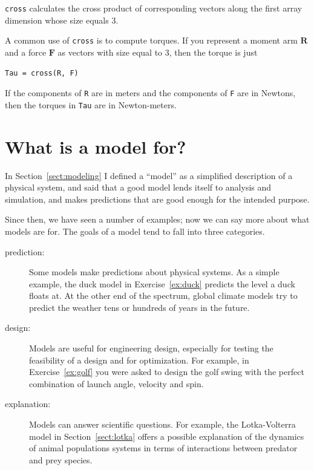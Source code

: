 \documentclass[
]{book}
\renewcommand{\vec}[1]{\bm{\mathbf{#1}}}
\begin{document}
{\tt cross} calculates the cross product of corresponding vectors along
the first array dimension whose size equals 3.

A common use of {\tt cross} is to compute torques.  If you represent
a moment arm $\vec{R}$ and a force $\vec{F}$ as vectors with size equal
to 3, then the torque is just

\begin{verbatim}
Tau = cross(R, F)
\end{verbatim}

If the components of {\tt R} are in meters and the components
of {\tt F} are in Newtons, then the torques in {\tt Tau} are
in Newton-meters.




\section{What is a model for?}

In Section~\ref{sect:modeling} I defined a ``model'' as a simplified
description of a physical system, and said that a good model
lends itself to analysis and simulation, and makes predictions
that are good enough for the intended purpose.

Since then, we have seen a number of examples; now we can
say more about what models are for.  The goals of a model tend
to fall into three categories.

\begin{description}

\item[prediction:] Some models make predictions about physical
systems.  As a simple example, the duck model in
Exercise~\ref{ex:duck} predicts the level a duck floats at.  At the other
end of the spectrum, global climate models try to predict the weather
tens or hundreds of years in the future.

\item[design:] Models are useful for engineering design, especially
for testing the feasibility of a design and for optimization.  For
example, in Exercise~\ref{ex:golf} you were asked to design the golf
swing with the perfect combination of launch angle, velocity and spin.

\item[explanation:] Models can answer scientific questions.  For
example, the Lotka-Volterra model in Section~\ref{sect:lotka} offers a
possible explanation of the dynamics of animal populations systems in
terms of interactions between predator and prey species.

\end{description}
\end{document}

